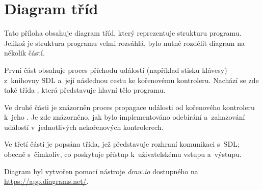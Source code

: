 
%






\chapter{Diagram tříd}

Tato příloha obsahuje diagram tříd, který reprezentuje strukturu programu. Jelikož je struktura programu velmi rozsáhlá, bylo nutné rozdělit diagram na několik částí.

První část obsahuje proces příchodu události (například stisku klávesy) z~knihovny SDL a~její následnou cestu ke kořenovému kontroleru. Nachází se zde také třída , která představuje hlavní tělo programu.

Ve druhé části je znázorněn proces propagace události od kořenového kontroleru k~jeho . Je zde znázorněno, jak bylo implementováno odebírání a~zahazování událostí v~jednotlivých nekořenových kontrolerech.

Ve třetí části je popsána třída, jež představuje rozhraní komunikaci s~SDL; obecně s~čímkoliv, co poskytuje přístup k~uživatelskému vstupu a~výstupu.

Diagram byl vytvořen pomocí nástroje \emph{draw.io} dostupného na \url{https://app.diagrams.net/}.




%
